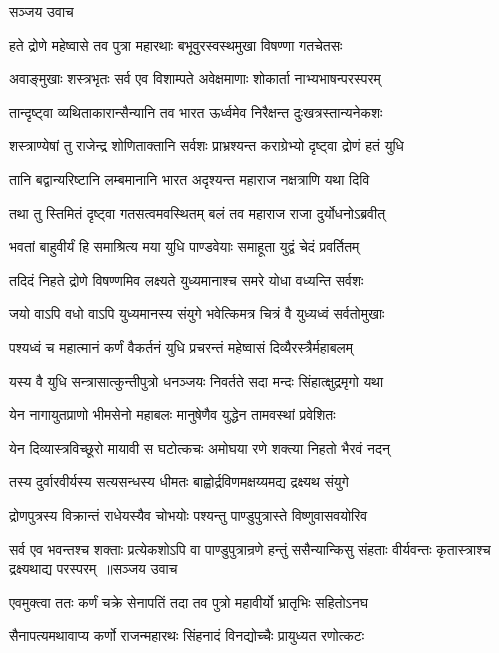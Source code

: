 \twolineshloka
{सञ्जय उवाच}
{}


\twolineshloka
{हते द्रोणे महेष्वासे तव पुत्रा महारथाः}
{बभूवुरस्वस्थमुखा विषण्णा गतचेतसः}


\twolineshloka
{अवाङ्मुखाः शस्त्रभृतः सर्व एव विशाम्पते}
{अवेक्षमाणाः शोकार्ता नाभ्यभाषन्परस्परम्}


\twolineshloka
{तान्दृष्ट्वा व्यथिताकारान्सैन्यानि तव भारत}
{ऊर्ध्वमेव निरैक्षन्त दुःखत्रस्तान्यनेकशः}


\twolineshloka
{शस्त्राण्येषां तु राजेन्द्र शोणिताक्तानि सर्वशः}
{प्राभ्रश्यन्त कराग्रेभ्यो दृष्ट्वा द्रोणं हतं युधि}


\twolineshloka
{तानि बद्वान्यरिष्टानि लम्बमानानि भारत}
{अदृश्यन्त महाराज नक्षत्राणि यथा दिवि}


\twolineshloka
{तथा तु स्तिमितं दृष्ट्वा गतसत्वमवस्थितम्}
{बलं तव महाराज राजा दुर्योधनोऽब्रवीत्}


\twolineshloka
{भवतां बाहुवीर्यं हि समाश्रित्य मया युधि}
{पाण्डवेयाः समाहूता युद्वं चेदं प्रवर्तितम्}


\twolineshloka
{तदिदं निहते द्रोणे विषण्णमिव लक्ष्यते}
{युध्यमानाश्च समरे योधा वध्यन्ति सर्वशः}


\twolineshloka
{जयो वाऽपि वधो वाऽपि युध्यमानस्य संयुगे}
{भवेत्किमत्र चित्रं वै युध्यध्वं सर्वतोमुखाः}


\twolineshloka
{पश्यध्वं च महात्मानं कर्णं वैकर्तनं युधि}
{प्रचरन्तं महेष्वासं दिव्यैरस्त्रैर्महाबलम्}


\twolineshloka
{यस्य वै युधि सन्त्रासात्कुन्तीपुत्रो धनञ्जयः}
{निवर्तते सदा मन्दः सिंहात्क्षुद्रमृगो यथा}


\twolineshloka
{येन नागायुतप्राणो भीमसेनो महाबलः}
{मानुषेणैव युद्धेन तामवस्थां प्रवेशितः}


\twolineshloka
{येन दिव्यास्त्रविच्छूरो मायावी स घटोत्कचः}
{अमोघया रणे शक्त्या निहतो भैरवं नदन्}


\twolineshloka
{तस्य दुर्वारवीर्यस्य सत्यसन्धस्य धीमतः}
{बाह्वोर्द्रविणमक्षय्यमद्य द्रक्ष्यथ संयुगे}


\twolineshloka
{द्रोणपुत्रस्य विक्रान्तं राधेयस्यैव चोभयोः}
{पश्यन्तु पाण्डुपुत्रास्ते विष्णुवासवयोरिव}


\fourlineindentedshloka
{सर्व एव भवन्तश्च शक्ताः प्रत्येकशोऽपि वा}
{पाण्डुपुत्रान्रणे हन्तुं ससैन्यान्किसु संहताः}
{वीर्यवन्तः कृतास्त्राश्च द्रक्ष्यथाद्य परस्परम् ॥सञ्जय उवाच}
{}


\twolineshloka
{एवमुक्त्वा ततः कर्णं चक्रे सेनापतिं तदा}
{तव पुत्रो महावीर्यो भ्रातृभिः सहितोऽनघ}


\twolineshloka
{सैनापत्यमथावाप्य कर्णो राजन्महारथः}
{सिंहनादं विनद्योच्चैः प्रायुध्यत रणोत्कटः}


